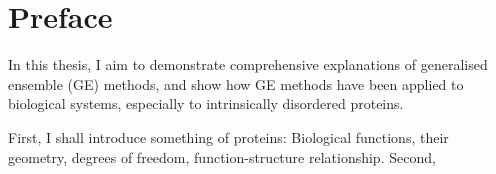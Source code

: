 \chapter*{Preface}
In this thesis, I aim to demonstrate comprehensive explanations of generalised ensemble (GE) methods, and show how GE methods have been applied to biological systems, especially to intrinsically disordered proteins.

First, I shall introduce something of proteins: Biological functions, their geometry, degrees of freedom, function-structure relationship. 
Second, 
